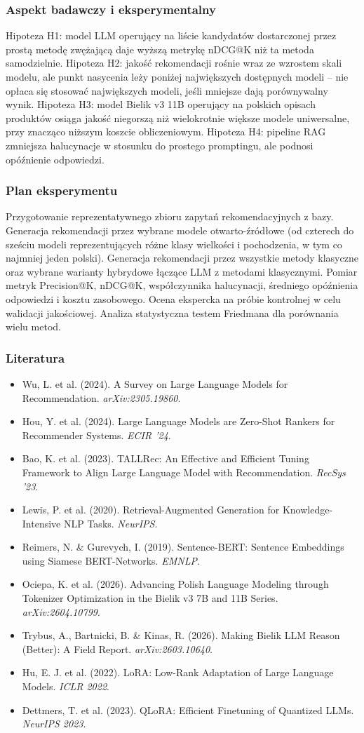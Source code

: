 \documentclass[12pt,a4paper]{article}
\newcommand{\topicsection}[1]{\subsubsection*{#1}}
\newenvironment{literatura}{%
    \topicsection{Literatura}
    \begin{itemize}[leftmargin=1.6em,labelsep=0.5em]
}{%
    \end{itemize}
}
\begin{document}
\topicsection{Aspekt badawczy i eksperymentalny}
Hipoteza H1: model LLM operujący na liście kandydatów dostarczonej przez prostą metodę zwężającą daje wyższą metrykę nDCG@K niż ta metoda samodzielnie. Hipoteza H2: jakość rekomendacji rośnie wraz ze wzrostem skali modelu, ale punkt nasycenia leży poniżej największych dostępnych modeli -- nie opłaca się stosować największych modeli, jeśli mniejsze dają porównywalny wynik. Hipoteza H3: model Bielik v3 11B operujący na polskich opisach produktów osiąga jakość niegorszą niż wielokrotnie większe modele uniwersalne, przy znacząco niższym koszcie obliczeniowym. Hipoteza H4: pipeline RAG zmniejsza halucynacje w stosunku do prostego promptingu, ale podnosi opóźnienie odpowiedzi.

\topicsection{Plan eksperymentu}
Przygotowanie reprezentatywnego zbioru zapytań rekomendacyjnych z bazy. Generacja rekomendacji przez wybrane modele otwarto-źródłowe (od czterech do sześciu modeli reprezentujących różne klasy wielkości i pochodzenia, w tym co najmniej jeden polski). Generacja rekomendacji przez wszystkie metody klasyczne oraz wybrane warianty hybrydowe łączące LLM z metodami klasycznymi. Pomiar metryk Precision@K, nDCG@K, współczynnika halucynacji, średniego opóźnienia odpowiedzi i kosztu zasobowego. Ocena ekspercka na próbie kontrolnej w celu walidacji jakościowej. Analiza statystyczna testem Friedmana dla porównania wielu metod.

\begin{literatura}
\item Wu, L. et al. (2024). A Survey on Large Language Models for Recommendation. \textit{arXiv:2305.19860}.
\item Hou, Y. et al. (2024). Large Language Models are Zero-Shot Rankers for Recommender Systems. \textit{ECIR '24}.
\item Bao, K. et al. (2023). TALLRec: An Effective and Efficient Tuning Framework to Align Large Language Model with Recommendation. \textit{RecSys '23}.
\item Lewis, P. et al. (2020). Retrieval-Augmented Generation for Knowledge-Intensive NLP Tasks. \textit{NeurIPS}.
\item Reimers, N. \& Gurevych, I. (2019). Sentence-BERT: Sentence Embeddings using Siamese BERT-Networks. \textit{EMNLP}.
\item Ociepa, K. et al. (2026). Advancing Polish Language Modeling through Tokenizer Optimization in the Bielik v3 7B and 11B Series. \textit{arXiv:2604.10799}.
\item Trybus, A., Bartnicki, B. \& Kinas, R. (2026). Making Bielik LLM Reason (Better): A Field Report. \textit{arXiv:2603.10640}.
\item Hu, E. J. et al. (2022). LoRA: Low-Rank Adaptation of Large Language Models. \textit{ICLR 2022}.
\item Dettmers, T. et al. (2023). QLoRA: Efficient Finetuning of Quantized LLMs. \textit{NeurIPS 2023}.
\end{literatura}
\end{document}
